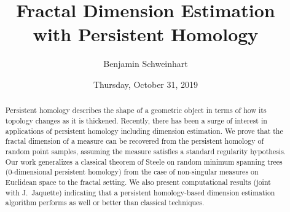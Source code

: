 \documentclass{UAmathtalk}
\author{Benjamin Schweinhart}
\title{Fractal Dimension Estimation\\ with Persistent Homology}
\date{Thursday, October 31, 2019}
\begin{document}
\maketitle

\begin{abstract}
Persistent homology describes the shape of a geometric object in terms of how its topology changes as it is thickened. Recently, there has been a surge of interest in applications of persistent homology including dimension estimation. We prove that the fractal dimension of a measure can be recovered from the persistent homology of random point samples, assuming the measure satisfies a standard regularity hypothesis. Our work generalizes a classical theorem of Steele on random minimum spanning trees (0-dimensional persistent homology) from the case of non-singular measures on Euclidean space to the fractal setting. We also present computational results (joint with J.~Jaquette) indicating that a persistent homology-based dimension estimation algorithm performs as well or better than classical techniques.
\end{abstract}
\end{document}
